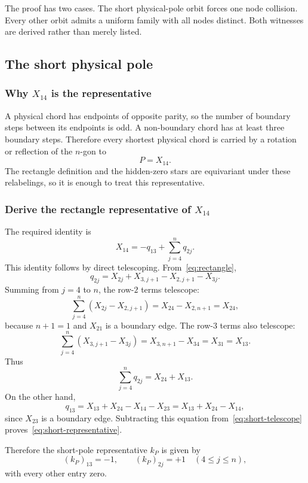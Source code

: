\documentclass[11pt]{article}
\theoremstyle{definition}
\begin{document}
The proof has two cases.  The short physical-pole orbit forces one node collision.  Every other orbit admits a uniform family with all nodes distinct.  Both witnesses are derived rather than merely listed.

\subsection{The short physical pole}

\subsubsection{Why \texorpdfstring{$X_{14}$}{X14} is the representative}

A physical chord has endpoints of opposite parity, so the number of boundary steps between its endpoints is odd.  A non-boundary chord has at least three boundary steps.  Therefore every shortest physical chord is carried by a rotation or reflection of the $n$-gon to
\[
P=X_{14}.
\]
The rectangle definition and the hidden-zero stars are equivariant under these relabelings, so it is enough to treat this representative.

\subsubsection{Derive the rectangle representative of \texorpdfstring{$X_{14}$}{X14}}

The required identity is
\begin{equation}
X_{14}=-q_{13}+\sum_{j=4}^n q_{2j}.
\label{eq:short-representative}
\end{equation}
This identity follows by direct telescoping.  From~\eqref{eq:rectangle},
\[
q_{2j}=X_{2j}+X_{3,j+1}-X_{2,j+1}-X_{3j}.
\]
Summing from $j=4$ to $n$, the row-$2$ terms telescope:
\[
\sum_{j=4}^n(X_{2j}-X_{2,j+1})
=X_{24}-X_{2,n+1}
=X_{24},
\]
because $n+1=1$ and $X_{21}$ is a boundary edge.  The row-$3$ terms also telescope:
\[
\sum_{j=4}^n(X_{3,j+1}-X_{3j})
=X_{3,n+1}-X_{34}
=X_{31}=X_{13}.
\]
Thus
\begin{equation}
\sum_{j=4}^nq_{2j}=X_{24}+X_{13}.
\label{eq:short-telescope}
\end{equation}
On the other hand,
\[
q_{13}=X_{13}+X_{24}-X_{14}-X_{23}
=X_{13}+X_{24}-X_{14},
\]
since $X_{23}$ is a boundary edge.  Subtracting this equation from~\eqref{eq:short-telescope} proves~\eqref{eq:short-representative}.

Therefore the short-pole representative $k_P$ is given by
\begin{equation}
(k_P)_{13}=-1,
\qquad
(k_P)_{2j}=+1\quad(4\le j\le n),
\label{eq:short-k}
\end{equation}
with every other entry zero.
\end{document}
